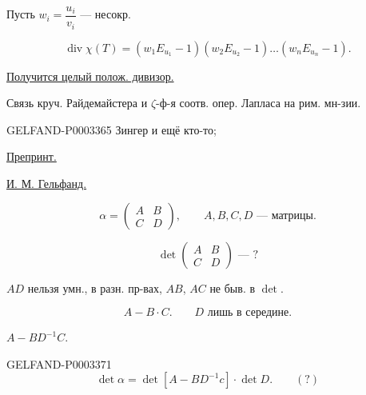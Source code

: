 Пусть $w_i=\dfrac{u_i}{v_i}$ --- несокр.

\begin{equation*}\operatorname{div}\chi(T)=(w_1E_{u_1}-1)(w_2E_{u_2}-1)\ldots(w_nE_{u_n}-1).\end{equation*}

\uline{Получится целый полож. дивизор.}

 Связь круч. Райдемайстера и $\zeta$-ф-я соотв. опер. Лапласа на рим. мн-зии.





\begin{GelfandAdjacentEvidence}{GELFAND-P000336}{5}
Зингер и ещё кто-то;

\end{GelfandAdjacentEvidence}


\uline{Препринт.}



\uline{И. М. Гельфанд.}

\begin{equation*}\alpha=\begin{pmatrix}A&B\\C&D\end{pmatrix},\qquad A,B,C,D\text{ --- матрицы.}\end{equation*}

\begin{equation*}\det\begin{pmatrix}A&B\\C&D\end{pmatrix}\text{ --- ?}\end{equation*}

$AD$ нельзя умн., в разн. пр-вах, $AB$, $AC$ не быв. в $\det$.

\begin{equation*}A-B\cdot C.\qquad\text{$D$ лишь в середине.}\end{equation*}

$A-BD^{-1}C$.

\begin{GelfandAdjacentEvidence}{GELFAND-P000337}{1}
\begin{equation*}\det\alpha=\det[A-BD^{-1}c]\cdot\det D.\qquad(?)\end{equation*}

\end{GelfandAdjacentEvidence}


